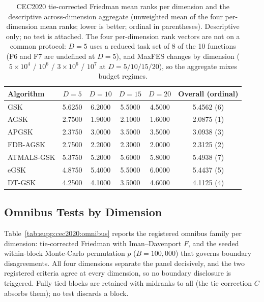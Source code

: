 \documentclass[algorithms,article,submit,moreauthors,pdftex]{Definitions/mdpi}
\newcommand{\zebra}{}
\begin{document}
\begin{table}[H]
\caption{CEC2020 tie-corrected Friedman mean ranks per dimension and the
descriptive across-dimension aggregate (unweighted mean of the four
per-dimension mean ranks; lower is better; ordinal in parentheses).
Descriptive only; no test is attached.  The four per-dimension rank
vectors are not on a common protocol: $D = 5$ uses a reduced task set of
8 of the 10 functions (F6 and F7 are undefined at $D = 5$), and MaxFES
changes by dimension ($5 \times 10^{4}$ / $10^{6}$ / $3 \times 10^{6}$
/ $10^{7}$ at $D = 5/10/15/20$), so the aggregate mixes budget regimes.
}\label{tab:supp:cec2020:ranks}
\centering
\tablesize{\footnotesize}
\zebra
\begin{tabular}{lccccc}
\toprule
\textbf{Algorithm} & \textbf{$D=5$} & \textbf{$D=10$} &
\textbf{$D=15$} & \textbf{$D=20$} & \textbf{Overall (ordinal)} \\
\midrule
GSK & 5.6250 & 6.2000 & 5.5000 & 4.5000 & 5.4562 (6) \\
AGSK & 2.7500 & 1.9000 & 2.1000 & 1.6000 & 2.0875 (1) \\
APGSK & 2.3750 & 3.0000 & 3.5000 & 3.5000 & 3.0938 (3) \\
FDB-AGSK & 2.7500 & 2.2000 & 2.3000 & 2.0000 & 2.3125 (2) \\
ATMALS-GSK & 5.3750 & 5.2000 & 5.6000 & 5.8000 & 5.4938 (7) \\
eGSK & 4.8750 & 5.4000 & 5.5000 & 6.0000 & 5.4437 (5) \\
DT-GSK & 4.2500 & 4.1000 & 3.5000 & 4.6000 & 4.1125 (4) \\
\bottomrule
\end{tabular}
\end{table}

\subsection{Omnibus Tests by Dimension}\label{sec:supp:cec2020:omnibus}

Table~\ref{tab:supp:cec2020:omnibus} reports the registered omnibus
family per dimension: tie-corrected Friedman with Iman--Davenport $F$, and
the seeded within-block Monte-Carlo permutation $p$ ($B = 100{,}000$)
that governs boundary disagreements.  All four dimensions separate the
panel decisively, and the two registered criteria agree at every
dimension, so no boundary disclosure is triggered.  Fully tied blocks are
retained with midranks to all (the tie correction $C$ absorbs them);
no test discards a block.
\end{document}
